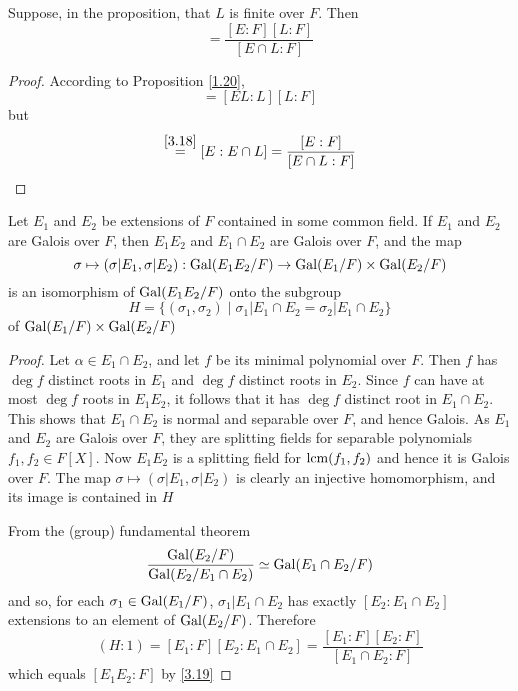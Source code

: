 \documentclass[11pt]{article}
\begin{document}
\begin{corollary}[]
\label{3.19}
Suppose, in the proposition, that \(L\) is finite over \(F\). Then
\begin{equation*}
[EL:F]=\frac{[E:F][L:F]}{[E\cap L:F]}
\end{equation*}
\end{corollary}

\begin{proof}
According to Proposition \ref{1.20},
\begin{equation*}
[EL:F]=[EL:L][L:F]
\end{equation*}
but
\begin{equation*}
[EL:L]\stackrel{\ref{3.18}}{= }[E:E\cap L]=\frac{[E:F]}{[E\cap L:F]}
\end{equation*}
\end{proof}

\begin{proposition}[]
Let \(E_1\) and \(E_2\) be extensions of \(F\) contained in some common field. If \(E_1\)
and \(E_2\) are Galois over \(F\), then \(E_1E_2\) and \(E_1\cap E_2\) are Galois over \(F\), and the
map
\begin{equation*}
\sigma\mapsto(\sigma|E_1,\sigma|E_2):\operatorname{Gal}(E_1E_2/F)\to\operatorname{Gal}(E_1/F)\times\operatorname{Gal}(E_2/F)
\end{equation*}
is an isomorphism of \(\operatorname{Gal}(E_1E_2/F)\) onto the subgroup
\begin{equation*}
H=\{(\sigma_1,\sigma_2)\mid\sigma_1|E_1\cap E_2=\sigma_2|E_1\cap E_2\}
\end{equation*}
of \(\operatorname{Gal}(E_1/F)\times\operatorname{Gal}(E_2/F)\)
\end{proposition}

\begin{proof}
Let \(\alpha\in E_1\cap E_2\), and let \(f\) be its minimal polynomial over \(F\). Then \(f\) has \(\deg f\)
distinct roots in \(E_1\) and \(\deg f\) distinct roots in \(E_2\). Since \(f\) can have at
most \(\deg f\) roots in \(E_1E_2\), it follows that it has \(\deg f\) distinct root
in \(E_1\cap E_2\). This shows that \(E_1\cap E_2\) is normal and separable over \(F\), and hence Galois.
As \(E_1\) and \(E_2\) are Galois over \(F\), they are splitting fields for separable
polynomials \(f_1,f_2\in F[X]\). Now \(E_1E_2\) is a splitting field for \(\operatorname{lcm}(f_1,f_2)\) and hence it
is Galois over \(F\). The map \(\sigma\mapsto(\sigma|E_1,\sigma|E_2)\) is clearly an injective homomorphism, and its
image is contained in \(H\)

From the (group) fundamental theorem
\begin{equation*}
\frac{\operatorname{Gal}(E_2/F)}{\operatorname{Gal}(E_2/E_1\cap E_2)}\simeq\operatorname{Gal}(E_1\cap E_2/F)
\end{equation*}
and so, for each \(\sigma_1\in\operatorname{Gal}(E_1/F)\), \(\sigma_1|E_1\cap E_2\) has exactly \([E_2:E_1\cap E_2]\) extensions to an
element of \(\operatorname{Gal}(E_2/F)\). Therefore
\begin{equation*}
(H:1)=[E_1:F][E_2:E_1\cap E_2]=\frac{[E_1:F][E_2:F]}{[E_1\cap E_2:F]}
\end{equation*}
which equals \([E_1E_2:F]\) by \ref{3.19}
\end{proof}
\end{document}
